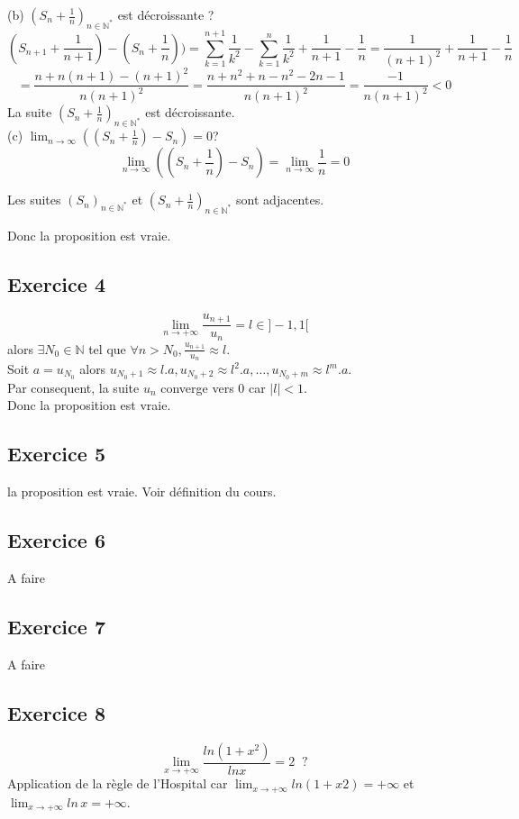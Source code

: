 \documentclass[]{book}
\theoremstyle{definition}
\newcommand{\bb}[1]{\mathbb{#1}}
\newcommand{\N}{\bb{N}}
\begin{document}
(b) $(S_n+\frac{1}{n})_{n \in \N^{*}}$ est d\'ecroissante ?\\
$$(S_{n+1} +\frac{1}{n+1}) - (S_{n}+\frac{1}{n})) = \sum_{k=1}^{n+1}\frac{1}{k^2} - \sum_{k=1}^{n}\frac{1}{k^2} + \frac{1}{n+1} - \frac{1}{n} = \frac{1}{(n+1)^2} + \frac{1}{n+1} - \frac{1}{n}$$  
$$= \frac{n+n(n+1)-(n+1)^2}{n(n+1)^2} = \frac{n+n^2+n-n^2-2n-1}{n(n+1)^2} = \frac{-1}{n(n+1)^2} < 0$$
La suite $(S_n+\frac{1}{n})_{n \in \N^{*}}$ est d\'ecroissante.\\

(c) $\lim_{n \to \infty}((S_n + \frac{1}{n}) - S_n) = 0 $?
$$\lim_{n \to \infty}((S_n + \frac{1}{n}) - S_n) = \lim_{n \to \infty}\frac{1}{n} = 0 $$


Les suites $(S_n)_{n \in \N^{*}}$ et $(S_n+\frac{1}{n})_{n \in \N^{*}}$ sont adjacentes.

Donc la proposition est vraie.

\subsection*{Exercice 4}
$$\lim_{n \to +\infty} \frac{u_{n+1}}{u_{n}} = l \in ]-1,1[$$ 
alors $\exists N_0 \in \mathbb{N}$ tel que $\forall n > N_{0}, \frac{u_{n+1}}{u_{n}} \approx l$. \\
Soit $a = u_{N_0}$ alors $u_{N_0+1} \approx l.a, u_{N_0+2} \approx {l^2.a}, \ldots , u_{N_0+m} \approx {l^{m}.a}$. \\
Par consequent, la suite $u_n$ converge vers $0$ car $|l| < 1$.
\\ 
Donc la proposition est vraie.


\subsection*{Exercice 5}
la proposition est vraie. Voir d\'efinition du cours.

\subsection*{Exercice 6}
A faire

\subsection*{Exercice 7}
A faire

\subsection*{Exercice 8}
$$\lim_{x \to +\infty} \frac{ln(1+x^2)}{ln x} = 2 \;\;?$$
Application de la r\`egle de l'Hospital car $\lim_{x \to +\infty} ln(1+x2) = +\infty$ et $\lim_{x \to +\infty} ln\, x = +\infty$.\\
\end{document}
